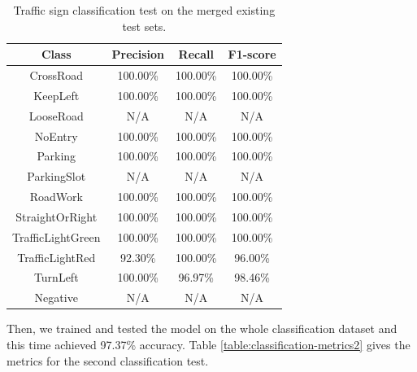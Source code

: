 \begin{table}[h]
  \begin{center}
    \caption{Traffic sign classification test on the merged existing test sets.}
    \label{table:classification-metrics1}
    \begin{tabular}{|c|c|c|c|}
      \hline
      \textbf{Class}    & \textbf{Precision} & \textbf{Recall}  & \textbf{F1-score} \\
      \hline
      CrossRoad         & 100.00\%           & 100.00\%         &  100.00\% \\ 
      \hline
      KeepLeft          & 100.00\%           & 100.00\%         & 100.00\% \\ 
      \hline
      LooseRoad         &   N/A              &  N/A             &  N/A     \\ 
      \hline
      NoEntry           & 100.00\%           & 100.00\%         &  100.00\% \\ 
      \hline
      Parking           & 100.00\%           & 100.00\%         &  100.00\% \\ 
      \hline
      ParkingSlot       &   N/A              & N/A              &    N/A   \\ 
      \hline
      RoadWork          & 100.00\%           & 100.00\%         &  100.00\% \\ 
      \hline
      StraightOrRight   & 100.00\%           & 100.00\%         & 100.00\%  \\ 
      \hline
      TrafficLightGreen & 100.00\%           & 100.00\%         & 100.00\%  \\ 
      \hline
      TrafficLightRed   & 92.30\%            & 100.00\%         & 96.00\%  \\ 
      \hline
      TurnLeft          & 100.00\%           & 96.97\%          & 98.46\%  \\
      \hline
      Negative          & N/A                & N/A              & N/A      \\
      \hline
    \end{tabular}
  \end{center}
\end{table}

Then, we trained and tested the model on the whole classification dataset and
this time achieved 97.37\% accuracy. Table \ref{table:classification-metrics2}
gives the metrics for the second classification test.

